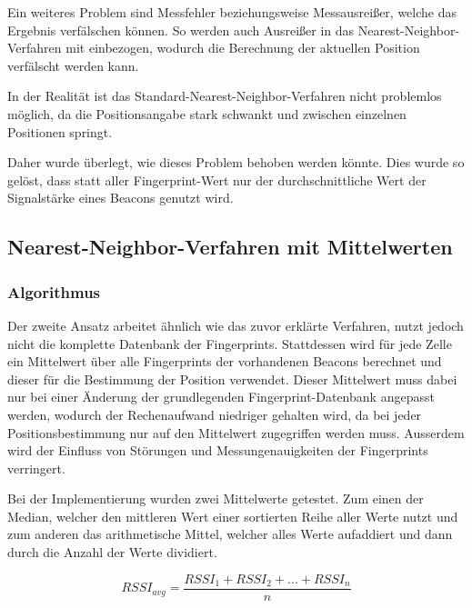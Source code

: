 Ein weiteres Problem sind Messfehler beziehungsweise Messausreißer, welche das Ergebnis verfälschen können. So werden auch Ausreißer in das Nearest-Neighbor-Verfahren mit einbezogen, wodurch die Berechnung der aktuellen Position verfälscht werden kann.

In der Realität ist das Standard-Nearest-Neighbor-Verfahren nicht problemlos möglich, da die Positionsangabe stark schwankt und zwischen einzelnen Positionen springt.

Daher wurde überlegt, wie dieses Problem behoben werden könnte. Dies wurde so gelöst, dass statt aller Fingerprint-Wert nur der durchschnittliche Wert der Signalstärke eines Beacons genutzt wird.


\subsection{Nearest-Neighbor-Verfahren mit Mittelwerten}
\label{sec:implementation:fingerprinting:positioning:avg}

\subsubsection{Algorithmus}
\label{sec:implementation:fingerprinting:positioning:avg:algorithm}

Der zweite Ansatz arbeitet ähnlich wie das zuvor erklärte Verfahren, nutzt jedoch nicht die komplette Datenbank der Fingerprints. 
Stattdessen wird für jede Zelle ein Mittelwert über alle Fingerprints der vorhandenen Beacons berechnet und dieser für die Bestimmung der Position verwendet.
Dieser Mittelwert muss dabei nur bei einer Änderung der grundlegenden Fingerprint-Datenbank angepasst werden, wodurch der Rechenaufwand niedriger gehalten wird, da bei jeder Positionsbestimmung nur auf den Mittelwert zugegriffen werden muss.
Ausserdem wird der Einfluss von Störungen und Messungenauigkeiten der Fingerprints verringert.

Bei der Implementierung wurden zwei Mittelwerte getestet. Zum einen der Median, welcher den mittleren Wert einer sortierten Reihe aller Werte nutzt und zum anderen das arithmetische Mittel, welcher alles Werte aufaddiert und dann durch die Anzahl der Werte dividiert.

\begin{equation}
	RSSI_{avg} = \frac{RSSI_{1} + RSSI_{2} + ... + RSSI_{n}}{n}
\end{equation}

